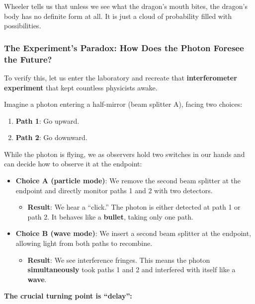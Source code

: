 Wheeler tells us that unless we see what the dragon's mouth bites, the dragon's body has no definite form at all. It is just a cloud of probability filled with possibilities.

\subsubsection{The Experiment's Paradox: How Does the Photon Foresee the Future?}

To verify this, let us enter the laboratory and recreate that \textbf{interferometer experiment} that kept countless physicists awake.

Imagine a photon entering a half-mirror (beam splitter A), facing two choices:

\begin{enumerate}
\item \textbf{Path 1}: Go upward.

\item \textbf{Path 2}: Go downward.
\end{enumerate}

While the photon is flying, we as observers hold two switches in our hands and can decide how to observe it at the endpoint:

\begin{itemize}
\item \textbf{Choice A (particle mode)}: We remove the second beam splitter at the endpoint and directly monitor paths 1 and 2 with two detectors.

\begin{itemize}
\item \textbf{Result}: We hear a ``click.'' The photon is either detected at path 1 or path 2. It behaves like a \textbf{bullet}, taking only one path.
\end{itemize}

\item \textbf{Choice B (wave mode)}: We insert a second beam splitter at the endpoint, allowing light from both paths to recombine.

\begin{itemize}
\item \textbf{Result}: We see interference fringes. This means the photon \textbf{simultaneously} took paths 1 and 2 and interfered with itself like a \textbf{wave}.
\end{itemize}
\end{itemize}

\textbf{The crucial turning point is ``delay'':}

